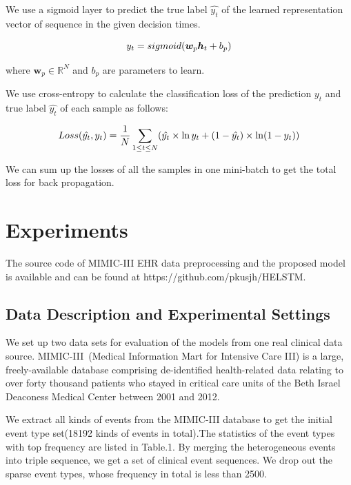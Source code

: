 \documentclass[letterpaper]{article} %
\begin{document}
We use a sigmoid layer to predict the true label $\hat{y_t}$ of the  learned representation vector of sequence in the given decision times.

\begin{equation}
\setlength{\abovedisplayskip}{3pt}
y_t = sigmoid(\bm w_p  \bm h_t + b_p )
\setlength{\belowdisplayskip}{3pt}
\end{equation}


where $\bm w_p \in \mathbb{R}^N$ and $b_p$ are parameters to learn.


We use cross-entropy to calculate the classification
loss of the prediction $y_t$ and true label $\hat{y_t}$ of each sample as follows:

\begin{equation}
\setlength{\abovedisplayskip}{3pt}
Loss(\hat{y_t},y_t)
= \frac{1}{N}\sum_{1\leq t \leq N } ( \hat{y_t}\times \ln y_t  +(1-\hat{y_t})\times \ln(1-y_t))
\setlength{\belowdisplayskip}{3pt}
\end{equation}


We can sum up the losses of all the samples in one mini-batch to get the total loss for back propagation.


\section{Experiments}
The source code of MIMIC-III EHR data preprocessing and the proposed model is available and can be found at https://github.com/pkusjh/HELSTM.

\subsection{Data Description and Experimental Settings}
We set up two data sets for evaluation of the models from one real clinical data source. MIMIC-III~\cite{johnson2016mimic}(Medical Information Mart for Intensive Care III) is a large, freely-available database comprising de-identified health-related data relating to over forty thousand patients who stayed in critical care units of the Beth Israel Deaconess Medical Center between 2001 and 2012.

We extract all kinds of events from the MIMIC-III database to get the initial event type  set(18192 kinds of events in total).The statistics of the event types with top frequency are listed in Table.1. By merging the heterogeneous events into triple sequence, we get a set of clinical event sequences. We drop out the sparse event types, whose frequency in total is less than 2500.
\end{document}
